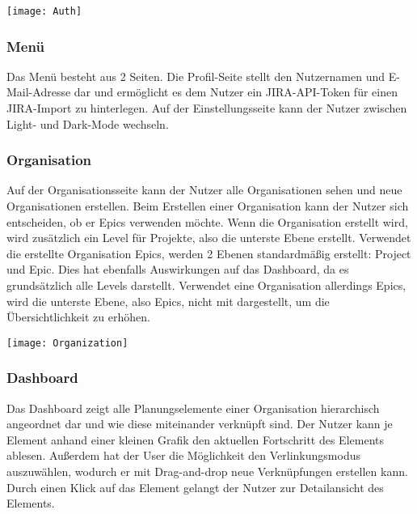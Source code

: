 \vspace{20pt}
\begin{center}
    \begin{minipage}{\linewidth}
        \texttt{[image: Auth]}
    \end{minipage}
\end{center}
\vspace{20pt}

\subsubsection{Menü}
Das Menü besteht aus 2 Seiten. Die Profil-Seite stellt den Nutzernamen und E-Mail-Adresse dar und ermöglicht es dem Nutzer ein JIRA-API-Token für einen JIRA-Import zu hinterlegen. Auf der Einstellungsseite kann der Nutzer zwischen Light- und Dark-Mode wechseln.

\subsubsection{Organisation}
Auf der Organisationsseite kann der Nutzer alle Organisationen sehen und neue Organisationen erstellen. Beim Erstellen einer Organisation kann der Nutzer sich entscheiden, ob er Epics verwenden möchte. Wenn die Organisation erstellt wird, wird zusätzlich ein Level für Projekte, also die unterste Ebene erstellt. Verwendet die erstellte Organisation Epics, werden 2 Ebenen standardmäßig erstellt: Project und Epic. Dies hat ebenfalls Auswirkungen auf das Dashboard, da es grundsätzlich alle Levels darstellt. Verwendet eine Organisation allerdings Epics, wird die unterste Ebene, also Epics, nicht mit dargestellt, um die Übersichtlichkeit zu erhöhen.

\vspace{20pt}
\begin{center}
    \begin{minipage}{\linewidth}
        \texttt{[image: Organization]}
    \end{minipage}
\end{center}
\vspace{20pt}


\subsubsection{Dashboard}
Das Dashboard zeigt alle Planungselemente einer Organisation hierarchisch angeordnet dar und wie diese miteinander verknüpft sind. Der Nutzer kann je Element anhand einer kleinen Grafik den aktuellen Fortschritt des Elements ablesen. Außerdem hat der User die Möglichkeit den Verlinkungsmodus auszuwählen, wodurch er mit Drag-and-drop neue Verknüpfungen erstellen kann. Durch einen Klick auf das Element gelangt der Nutzer zur Detailansicht des Elements.

